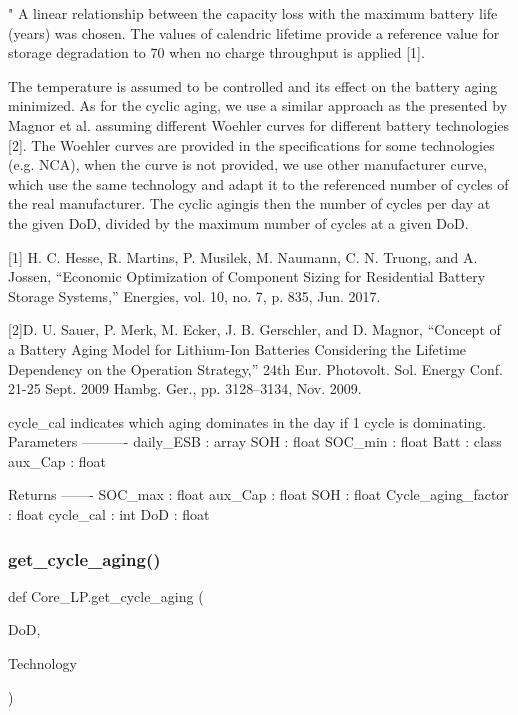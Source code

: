 \begin{DoxyVerb}"
A linear relationship between the capacity loss with the maximum battery
life (years) was chosen. The values of calendric lifetime provide a
reference value for storage degradation to 70%
when no charge throughput is applied [1].

The temperature is assumed to be controlled and its effect on the battery
aging minimized. As for the cyclic aging, we use a similar approach as the
presented by Magnor et al. assuming different Woehler curves for different
battery technologies [2]. The Woehler curves are provided in the
specifications for some technologies (e.g. NCA), when the curve is not
provided, we use other manufacturer curve, which use the same technology
and adapt it to the referenced number of cycles of the real manufacturer.
The cyclic agingis then the number of cycles per day at the given DoD,
divided by the maximum number of cycles at a given DoD.

[1] H. C. Hesse, R. Martins, P. Musilek, M. Naumann, C. N. Truong, and A.
Jossen, “Economic Optimization of Component Sizing for Residential
Battery Storage Systems,” Energies, vol. 10, no. 7, p. 835, Jun. 2017.

[2]D. U. Sauer, P. Merk, M. Ecker, J. B. Gerschler, and D. Magnor, “Concept
of a Battery Aging Model for Lithium-Ion Batteries Considering the Lifetime
Dependency on the Operation Strategy,” 24th Eur. Photovolt. Sol. Energy
Conf. 21-25 Sept. 2009 Hambg. Ger., pp. 3128–3134, Nov. 2009.

cycle_cal indicates which aging dominates in the day if 1 cycle is dominating.
Parameters
----------
daily_ESB : array
SOH : float
SOC_min : float
Batt : class
aux_Cap : float

Returns
-------
SOC_max : float
aux_Cap : float
SOH : float
Cycle_aging_factor : float
cycle_cal : int
DoD : float
\end{DoxyVerb}
 \mbox{\label{namespace_core___l_p_a90d03e131848066a67ee156ba403f3c2}} 
\subsubsection{\texorpdfstring{get\+\_\+cycle\+\_\+aging()}{get\_cycle\_aging()}}
{\footnotesize\ttfamily def Core\+\_\+\+L\+P.\+get\+\_\+cycle\+\_\+aging (\begin{DoxyParamCaption}\item[{}]{DoD,  }\item[{}]{Technology }\end{DoxyParamCaption})}

